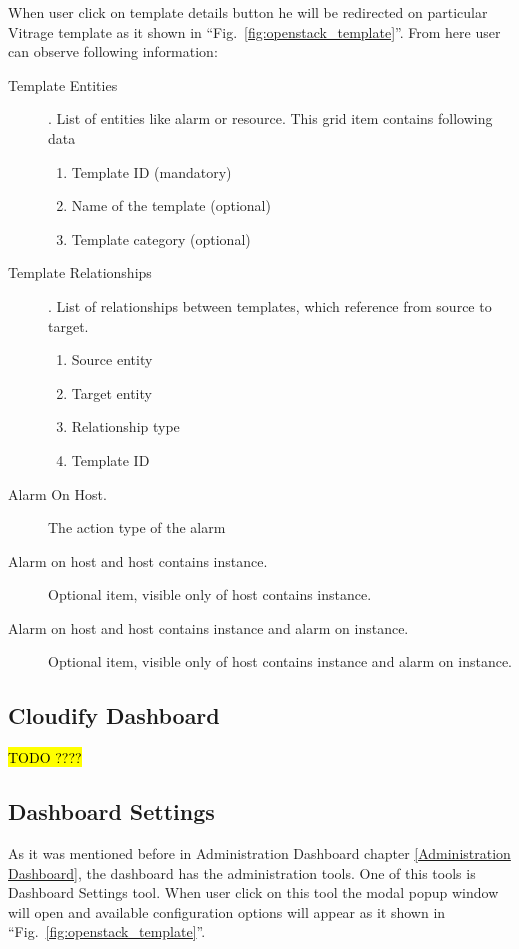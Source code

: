 When user click on template details button he will be redirected on particular Vitrage template as it shown in ``Fig.~\ref{fig:openstack_template}''. From here user can observe following information:
\begin{description}
\item[Template Entities]. List of entities like alarm or resource. This grid item contains following data
\begin{enumerate}
\item Template ID (mandatory)
\item Name of the template (optional)
\item Template category (optional)
\end{enumerate}
\item[Template Relationships]. List of relationships between templates, which reference from source to target.
\begin{enumerate}
\item Source entity
\item Target entity
\item Relationship type
\item Template ID
\end{enumerate}
\item[Alarm On Host.] The action type of the alarm
\item[Alarm on host and host contains instance.] Optional item, visible only of host contains instance.
\item[Alarm on host and host contains instance and alarm on instance.] Optional item, visible only of host contains instance and alarm on instance.

\end{description}



\subsection{Cloudify Dashboard}\label{Cloudify Dashboard}

\hl{TODO ????}

\subsection{Dashboard Settings}\label{Dashboard Settings}
As it was mentioned before in Administration Dashboard chapter \autoref{Administration Dashboard}, the dashboard has the administration tools. One of this tools is Dashboard Settings tool. When user click on this tool the modal popup window will open and available configuration options will appear as it shown in ``Fig.~\ref{fig:openstack_template}''.

